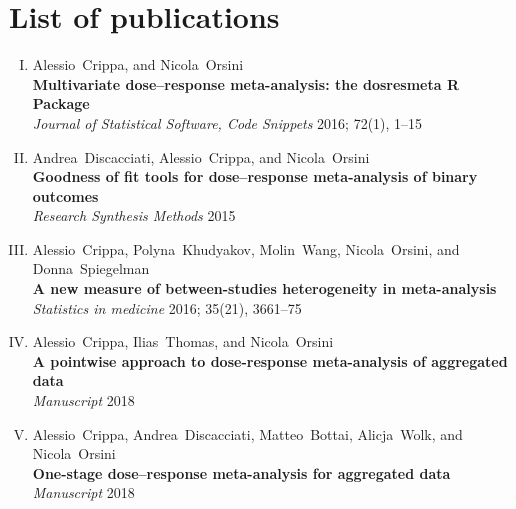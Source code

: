 %

\chapter*{List of publications}

\begin{enumerate}[I.]
\item Alessio~Crippa, and Nicola~Orsini \\ \textbf{Multivariate dose--response meta-analysis: the dosresmeta R Package} \\ \textit{Journal of Statistical Software, Code Snippets} 2016; 72(1), 1--15
\item Andrea~Discacciati, Alessio~Crippa, and Nicola~Orsini \\ \textbf{Goodness of fit tools for dose--response meta-analysis of binary outcomes} \\ \textit{Research Synthesis Methods} 2015
\item Alessio~Crippa, Polyna~Khudyakov, Molin~Wang, Nicola~Orsini, and Donna~Spiegelman \\ \textbf{A new measure of between-studies heterogeneity in meta-analysis} \\ \textit{Statistics in medicine} 2016; 35(21), 3661--75
\item Alessio~Crippa, Ilias~Thomas, and Nicola~Orsini \\ \textbf{A pointwise approach to dose-response meta-analysis of aggregated data} \\ \textit{Manuscript} 2018
\item Alessio~Crippa, Andrea~Discacciati, Matteo~Bottai, Alicja~Wolk, and Nicola~Orsini \\ \textbf{One-stage dose--response meta-analysis for aggregated data} \\ \textit{Manuscript} 2018
\end{enumerate}
 \\  

